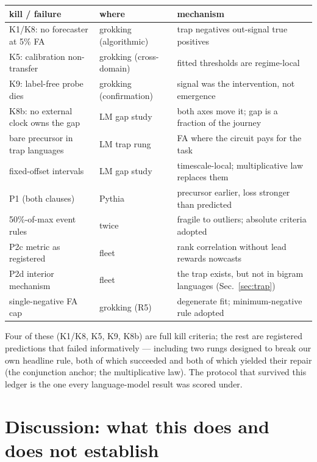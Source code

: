 \documentclass[11pt]{article}
\begin{document}
\begin{center}\footnotesize
\begin{tabular}{@{}p{}p{}p{}@{}}
\toprule
kill / failure & where & mechanism \\
\midrule
K1/K8: no forecaster at 5\% FA & grokking (algorithmic) & trap negatives out-signal true positives \\
K5: calibration non-transfer & grokking (cross-domain) & fitted thresholds are regime-local \\
K9: label-free probe dies & grokking (confirmation) & signal was the intervention, not emergence \\
K8b: no external clock owns the gap & LM gap study & both axes move it; gap is a fraction of the journey \\
bare precursor in trap languages & LM trap rung & \wTrapBareFA{} FA where the circuit pays for the task \\
fixed-offset intervals & LM gap study & timescale-local; multiplicative law replaces them \\
P1 (both clauses) & Pythia & precursor earlier, loss stronger than predicted \\
50\%-of-max event rules & twice & fragile to outliers; absolute criteria adopted \\
P2c metric as registered & fleet & rank correlation without lead rewards nowcasts \\
P2d interior mechanism & fleet & the trap exists, but not in bigram languages (Sec.~\ref{sec:trap}) \\
single-negative FA cap & grokking (R5) & degenerate fit; minimum-negative rule adopted \\
\bottomrule
\end{tabular}
\end{center}

Four of these (K1/K8, K5, K9, K8b) are full kill criteria; the rest are registered
predictions that failed informatively --- including two rungs designed to break our own
headline rule, both of which succeeded and both of which yielded their repair (the
conjunction anchor; the multiplicative law). The protocol that survived this ledger is
the one every language-model result was scored under.

\section{Discussion: what this does and does not establish}
\label{sec:disc}
\end{document}
